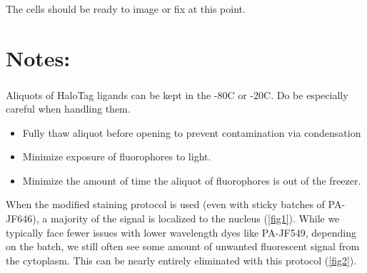 \documentclass[%
 reprint,
 amsmath,amssymb,
 aps,
nobalancelastpage
]{revtex4-1}
\begin{document}
The cells should be ready to image or fix at this point.

\section{\label{sec:level3}Notes:}

Aliquots of HaloTag\textsuperscript{\textregistered} ligands can be kept in the -80\degree C or -20\degree C. Do be especially careful when handling them. 

\begin{itemize}
  \item Fully thaw aliquot before opening to prevent contamination via condensation
  \item Minimize exposure of fluorophores to light. 
  \item Minimize the amount of time the aliquot of fluorophores is out of the freezer. 
\end{itemize}

When the modified staining protocol is used (even with sticky batches of PA-JF646), a majority of the signal is localized to the nucleus (\ref{fig1}). While we typically face fewer issues with lower wavelength dyes like PA-JF549, depending on the batch, we still often see some amount of unwanted fluorescent signal from the cytoplasm. This can be nearly entirely eliminated with this protocol (\ref{fig2}).
\end{document}
